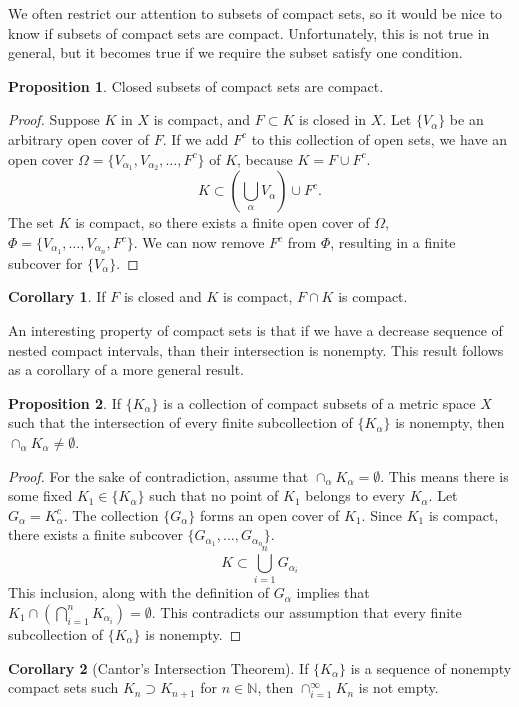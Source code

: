\documentclass{article}
\newcommand{\N}{\mathbb{N}}
\theoremstyle{definition}
\newtheorem{proposition}{Proposition}[section]
\newtheorem{corollary}{Corollary}[section]
\begin{document}
We often restrict our attention to subsets of compact sets, so it would be nice to know if subsets of compact sets are compact. Unfortunately, this is not true in general, but it becomes true if we require the subset satisfy one condition. 
\begin{proposition}
	Closed subsets of compact sets are compact.
\end{proposition}
\begin{proof}
	Suppose $ K $ in $ X $ is compact, and $ F\subset K $ is closed in $ X $. Let $ \{V_\alpha\} $ be an arbitrary open cover of $ F $. If we add $ F^c $ to this collection of open sets, we have an open cover $ \Omega=\{V_{\alpha_1},V_{\alpha_2},\ldots,F^c\} $ of $ K $, because $ K=F\cup F^c $. $$ K\subset\left(\bigcup_\alpha V_\alpha\right)\cup F^c.$$ The set $ K $ is compact, so there exists a finite open cover of $ \Omega $, $ \Phi=\{V_{\alpha_1},\ldots,V_{\alpha_n}, F^c\} $. We can now remove $ F^c $ from $ \Phi $, resulting in a finite subcover for $ \{V_\alpha\} $. 
\end{proof}
\begin{corollary}
	If $ F $ is closed and $ K $ is compact, $ F\cap K $ is compact. 
\end{corollary}
An interesting property of compact sets is that if we have a decrease sequence of nested compact intervals, than their intersection is nonempty. This result follows as a corollary of a more general result.
\begin{proposition}
	If $ \{K_\alpha\} $ is a collection of compact subsets of a metric space $ X $ such that the intersection of every finite subcollection of $ \{K_\alpha\} $ is nonempty, then $ \cap_\alpha K_\alpha\neq\emptyset $. 
\end{proposition}
\begin{proof}
For the sake of contradiction, assume that $ \cap_\alpha K_\alpha=\emptyset $. This means there is some fixed $K_1\in \{K_\alpha\}$ such that no point of $ K_1 $ belongs to every $ K_\alpha $. Let $ G_\alpha= K_\alpha^c $. The collection $ \{G_\alpha\} $ forms an open cover of $ K_1$. Since $ K_1 $ is compact, there exists a finite subcover $ \{G_{\alpha_1},\ldots,G_{\alpha_n}\} $. $$ K\subset\bigcup_{i=1}^nG_{\alpha_i}$$ This inclusion, along with the definition of $ G_\alpha $ implies that $ K_1\cap\left(\bigcap_{i=1}^nK_{\alpha_i}\right)=\emptyset $. This contradicts our assumption that every finite subcollection of $ \{K_\alpha\} $ is nonempty. 
\end{proof}
\begin{corollary}[Cantor's Intersection Theorem]
If $ \{K_\alpha\} $ is a sequence of nonempty compact sets such $ K_{n}\supset K_{n+1} $ for $ n\in\N $, then $ \cap_{i=1}^\infty K_n $ is not empty.
\end{corollary}
\end{document}
